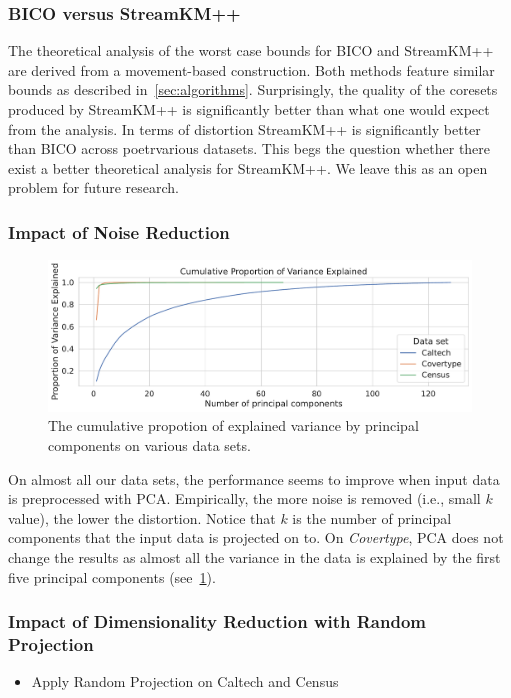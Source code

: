 \subsubsection*{BICO versus StreamKM++}
The theoretical analysis of the worst case bounds for BICO and StreamKM++ are derived from a movement-based construction. Both methods feature similar bounds as described in~\cref{sec:algorithms}. Surprisingly, the quality of the coresets produced by StreamKM++ is significantly better than what one would expect from the analysis. In terms of distortion StreamKM++ is significantly better than BICO across poetrvarious datasets. This begs the question whether there exist a better theoretical analysis for StreamKM++. We leave this as an open problem for future research.



\subsubsection*{Impact of Noise Reduction}

\begin{figure}
  \caption{The cumulative propotion of explained variance by principal components on various data sets.}
  \label{fig:explained-variance-pca}
  \includegraphics[width=1\linewidth]{figures/explained-variance-plot.pdf}
\end{figure}

On almost all our data sets, the performance seems to improve when input data is preprocessed with PCA. Empirically, the more noise is removed (i.e., small $k$ value), the lower the distortion. Notice that $k$ is the number of principal components that the input data is projected on to. On \textit{Covertype}, PCA does not change the results as almost all the variance in the data is explained by the first five principal components (see~\cref{fig:explained-variance-pca}). 




\subsubsection*{Impact of Dimensionality Reduction with Random Projection}
\begin{itemize}
    \item Apply Random Projection on Caltech and Census
\end{itemize}


